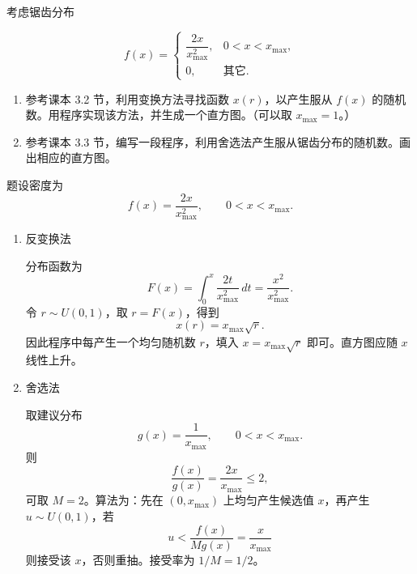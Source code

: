 \begin{question}
考虑锯齿分布

\[
f(x)=\begin{cases}
\dfrac{2x}{x_{\max}^2}, & 0<x<x_{\max},\\
0, & \text{其它}.
\end{cases}
\]

\begin{enumerate}
\item
  参考课本 3.2 节，利用变换方法寻找函数 \(x(r)\)，以产生服从 \(f(x)\)
  的随机数。用程序实现该方法，并生成一个直方图。（可以取
  \(x_{\max}=1\)。）
\item
  参考课本 3.3
  节，编写一段程序，利用舍选法产生服从锯齿分布的随机数。画出相应的直方图。
\end{enumerate}
\begin{solution}
题设密度为
\[
f(x)=\frac{2x}{x_{\max}^2},\qquad 0<x<x_{\max}.
\]

\begin{enumerate}
\item 反变换法

分布函数为
\[
F(x)=\int_0^x\frac{2t}{x_{\max}^2}\,dt=\frac{x^2}{x_{\max}^2}.
\]
令 \(r\sim U(0,1)\)，取 \(r=F(x)\)，得到
\[
x(r)=x_{\max}\sqrt r.
\]
因此程序中每产生一个均匀随机数 \(r\)，填入
\(x=x_{\max}\sqrt r\) 即可。直方图应随 \(x\) 线性上升。

\item 舍选法

取建议分布
\[
g(x)=\frac1{x_{\max}},\qquad 0<x<x_{\max}.
\]
则
\[
\frac{f(x)}{g(x)}=\frac{2x}{x_{\max}}\le 2,
\]
可取 \(M=2\)。算法为：先在 \((0,x_{\max})\) 上均匀产生候选值
\(x\)，再产生 \(u\sim U(0,1)\)，若
\[
u<\frac{f(x)}{Mg(x)}=\frac{x}{x_{\max}}
\]
则接受该 \(x\)，否则重抽。接受率为 \(1/M=1/2\)。
\end{enumerate}
\end{solution}
\end{question}


